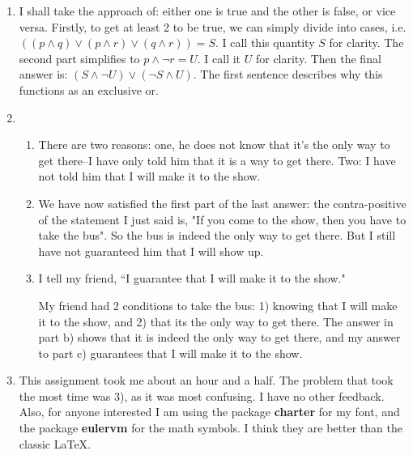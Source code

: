 \documentclass[12pt]{article}
\theoremstyle{definition}
\theoremstyle{remark}
\begin{document}
\begin{enumerate}[leftmargin=\labelsep]
	\newpage
	\item I shall take the approach of: either one is true and the other is false, or vice versa. Firstly, to get at least 2 to be true, we can simply divide into cases, i.e. $((p \land q) \lor (p \land r) \lor (q \land r)) = S$. I call this quantity $S$ for clarity. The second part simplifies to $p \land \lnot r = U$. I call it $U$ for clarity. Then the final answer is:
	$(S \land \lnot U) \lor (\lnot S \land U)$. The first sentence describes why this functions as an exclusive or.
	
	\newpage
	\item
	\begin{enumerate}
		\item There are two reasons: one, he does not know that it's the only way to get there--I have only told him that it is a way to get there. Two: I have not told him that I will make it to the show.
		
		\item 
		We have now satisfied the first part of the last answer: the contra-positive of the statement I just said is, "If you come to the show, then you have to take the bus". So the bus is indeed the only way to get there. But I still have not guaranteed him that I will show up.
		
		\item 
		I tell my friend, ``I guarantee that I will make it to the show."
		
		My friend had 2 conditions to take the bus: 1) knowing that I will make it to the show, and 2) that its the only way to get there. The answer in part b) shows that it is indeed the only way to get there, and my answer to part c) guarantees that I will make it to the show.
	\end{enumerate}

	\newpage
	\item 
	This assignment took me about an hour and a half. The problem that took the most time was 3), as it was most confusing. I have no other feedback. Also, for anyone interested I am using the package \textbf{charter} for my font, and the package \textbf{eulervm} for the math symbols. I think they are better than the classic \LaTeX.
	\end{enumerate}
\end{document}
